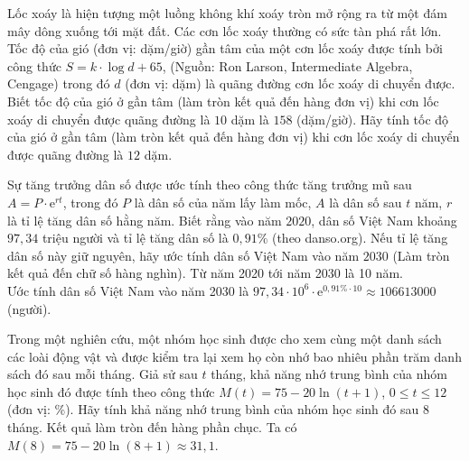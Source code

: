 \begin{bt}%

	Lốc xoáy là hiện tượng một luồng không khí xoáy tròn mở rộng ra từ một đám mây dông xuống tới mặt đất. Các cơn lốc xoáy thường có sức tàn phá rất lớn. Tốc độ của gió (đơn vị: dặm/giờ) gần tâm của một cơn lốc xoáy được tính bởi công thức $S=k\cdot \log d+65$, (Nguồn: Ron Larson, Intermediate Algebra, Cengage) trong đó $d$ (đơn vị: dặm) là quãng đường cơn lốc xoáy di chuyển được. Biết  tốc độ của gió ở gần tâm (làm tròn kết quả đến hàng đơn vị) khi cơn lốc xoáy di chuyển được quãng đường là $10$ dặm là $158$ (dặm/giờ). Hãy tính tốc độ của gió ở gần tâm (làm tròn kết quả đến hàng đơn vị) khi cơn lốc xoáy di chuyển được quãng đường là $12$ dặm.
\end{bt}

\begin{bt}%

	Sự tăng trưởng dân số được ước tính theo công thức tăng trưởng mũ sau $A=P \cdot \mathrm{e}^{rt}$, trong đó $P$ là dân số của năm lấy làm mốc, $A$ là dân số sau $t$ năm, $r$ là tỉ lệ tăng dân số hằng năm. Biết rằng vào năm $2020$, dân số Việt Nam khoảng $97{,}34$ triệu người và tỉ lệ tăng dân số là $0{,}91\% $ (theo danso.org). Nếu tỉ lệ tăng dân số này giữ nguyên, hãy ước tính dân số Việt Nam vào năm $2030$ (Làm tròn kết quả đến chữ số hàng nghìn).
	\loigiai
	{
		Từ năm 2020 tới năm 2030 là 10 năm.\\
		Ước tính dân số Việt Nam vào năm 2030 là $97{,}34 \cdot 10^6 \cdot \mathrm{e}^{0{,}91\% \cdot 10} \approx 106613000$ (người).
	}
\end{bt}

\begin{bt}%

	Trong một nghiên cứu, một nhóm học sinh được cho xem cùng một danh sách các loài động vật và được kiểm tra lại xem họ còn nhớ bao nhiêu phần trăm danh sách đó sau mỗi tháng. Giả sử sau $t$ tháng, khả năng nhớ trung bình của nhóm học sinh đó được tính theo công thức $M(t) = 75 - 20\ln(t+1)$, $0 \le t \le 12$ (đơn vị: \%). Hãy tính khả năng nhớ trung bình của nhóm học sinh đó sau $8$ tháng. Kết quả làm tròn đến hàng phần chục.
	\loigiai
	{
		Ta có $M(8) = 75 - 20\ln(8+1) \approx 31{,}1$.
	}
\end{bt}

